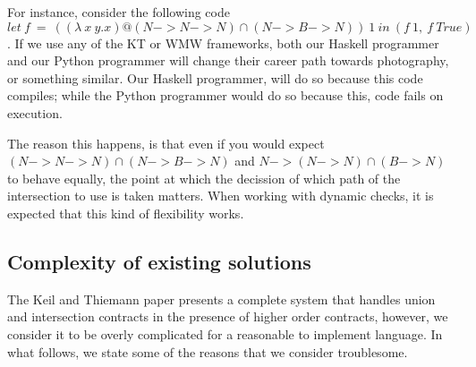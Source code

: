 For instance, consider the following code
$let~f~=~((\lambda~x~y.x)@(N -> N -> N) \cap (N -> B -> N))~1~in~(f~1,~f~True)$.
If we use any of the KT or WMW frameworks, both our Haskell programmer and our
Python programmer will change their career path towards photography, or something
similar.
Our Haskell programmer, will do so because this code compiles;
while the Python programmer would do so because this, code fails on execution.

The reason this happens, is that even if you would expect
$(N -> N -> N) \cap (N -> B -> N)$
and $N -> (N -> N) \cap (B -> N)$ to behave equally, the point at which
the decission of which path of the intersection to use is taken
matters.
When working with dynamic checks, it is expected that this kind of
flexibility works.



\subsection{Complexity of existing solutions}

The Keil and Thiemann paper presents a complete system that handles union and intersection
contracts in the presence of higher order contracts, however, we consider it to be overly
complicated for a reasonable to implement language.
In what follows, we state some of the reasons that we consider troublesome.




